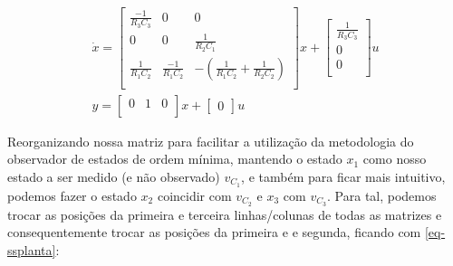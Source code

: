 \documentclass[
	12pt,				%
	article,			%
	openright,			%
	oneside,
	a4paper,			%
	chapter=TITLE,		%
	section=TITLE,		%
	english,			%
	french,				%
	spanish,			%
	brazil,				%
]{abntex2}
\begin{document}
        	\begin{eqnarray}
        	    \nonumber
        		\dot{x} = 
                \begin{bmatrix}
                    \frac{-1}{R_3 C_3} & 0 & 0 \\
                    0 & 0 & \frac{1}{R_2 C_1} \\
                    \frac{1}{R_1 C_2} & \frac{-1}{R_1 C_2} & -\left( \frac{1}{R_1 C_2} + \frac{1}{R_2 C_2} \right) \\
                \end{bmatrix}x
                +
                \begin{bmatrix}
                    \frac{1}{R_3 C_3} \\
                    0 \\
                    0 \\
                \end{bmatrix}u \\
                \label{eq-ssplanta_pre}
                y = 
                \begin{bmatrix}
                    0 & 1 & 0 \\
                \end{bmatrix}x
                +
                \begin{bmatrix}
                    0
                \end{bmatrix}u
        	\end{eqnarray}
        	
        	Reorganizando nossa matriz para facilitar a utilização da metodologia do observador de estados de ordem mínima, mantendo o estado $x_1$ como nosso estado a ser medido (e não observado) $v_{C_1}$, e também para ficar mais intuitivo, podemos fazer o estado $x_2$ coincidir com $v_{C_2}$ e $x_3$ com $v_{C_3}$. Para tal, podemos trocar as posições da primeira e terceira linhas/colunas de todas as matrizes e consequentemente trocar as posições da primeira e e segunda, ficando com \ref{eq-ssplanta}:
        	
\end{document}
